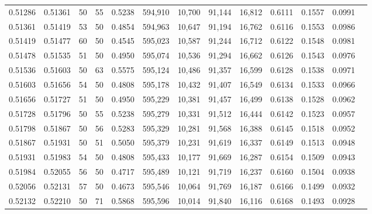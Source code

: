 \begin{tabular}{rrrrrrrrrrrrr}
0.51286 & 0.51361 &    50 &  55 &                                     0.5238 & 594,910 &  10,700 &  91,144 &  16,812 & 0.6111 & 0.1557 & 0.0991 \\
0.51361 & 0.51419 &    53 &  50 &                                     0.4854 & 594,963 &  10,647 &  91,194 &  16,762 & 0.6116 & 0.1553 & 0.0986 \\
0.51419 & 0.51477 &    60 &  50 &                                     0.4545 & 595,023 &  10,587 &  91,244 &  16,712 & 0.6122 & 0.1548 & 0.0981 \\
0.51478 & 0.51535 &    51 &  50 &                                     0.4950 & 595,074 &  10,536 &  91,294 &  16,662 & 0.6126 & 0.1543 & 0.0976 \\
0.51536 & 0.51603 &    50 &  63 &                                     0.5575 & 595,124 &  10,486 &  91,357 &  16,599 & 0.6128 & 0.1538 & 0.0971 \\
0.51603 & 0.51656 &    54 &  50 &                                     0.4808 & 595,178 &  10,432 &  91,407 &  16,549 & 0.6134 & 0.1533 & 0.0966 \\
0.51656 & 0.51727 &    51 &  50 &                                     0.4950 & 595,229 &  10,381 &  91,457 &  16,499 & 0.6138 & 0.1528 & 0.0962 \\
0.51728 & 0.51796 &    50 &  55 &                                     0.5238 & 595,279 &  10,331 &  91,512 &  16,444 & 0.6142 & 0.1523 & 0.0957 \\
0.51798 & 0.51867 &    50 &  56 &                                     0.5283 & 595,329 &  10,281 &  91,568 &  16,388 & 0.6145 & 0.1518 & 0.0952 \\
0.51867 & 0.51931 &    50 &  51 &                                     0.5050 & 595,379 &  10,231 &  91,619 &  16,337 & 0.6149 & 0.1513 & 0.0948 \\
0.51931 & 0.51983 &    54 &  50 &                                     0.4808 & 595,433 &  10,177 &  91,669 &  16,287 & 0.6154 & 0.1509 & 0.0943 \\
0.51984 & 0.52055 &    56 &  50 &                                     0.4717 & 595,489 &  10,121 &  91,719 &  16,237 & 0.6160 & 0.1504 & 0.0938 \\
0.52056 & 0.52131 &    57 &  50 &                                     0.4673 & 595,546 &  10,064 &  91,769 &  16,187 & 0.6166 & 0.1499 & 0.0932 \\
0.52132 & 0.52210 &    50 &  71 &                                     0.5868 & 595,596 &  10,014 &  91,840 &  16,116 & 0.6168 & 0.1493 & 0.0928 \\

\end{tabular}
